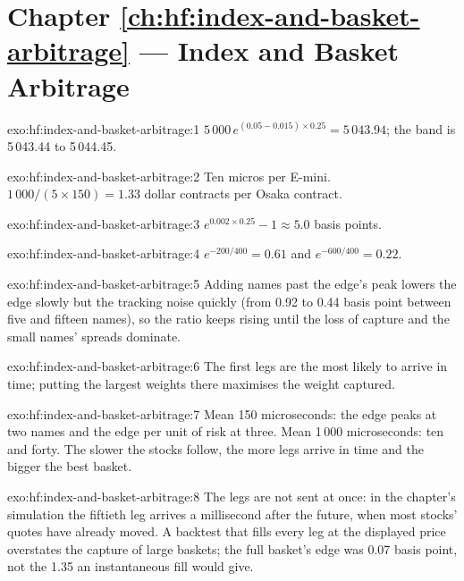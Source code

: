 \section*{Chapter \ref{ch:hf:index-and-basket-arbitrage} --- Index and Basket Arbitrage}

\begin{solution}{exo:hf:index-and-basket-arbitrage:1}
$5\,000\,e^{(0.05-0.015)\times0.25}=5\,043.94$; the band is 5\,043.44 to 5\,044.45.
\end{solution}

\begin{solution}{exo:hf:index-and-basket-arbitrage:2}
Ten micros per E-mini. $1\,000/(5\times150)=1.33$ dollar contracts per Osaka contract.
\end{solution}

\begin{solution}{exo:hf:index-and-basket-arbitrage:3}
$e^{0.002\times0.25}-1\approx5.0$ basis points.
\end{solution}

\begin{solution}{exo:hf:index-and-basket-arbitrage:4}
$e^{-200/400}=0.61$ and $e^{-600/400}=0.22$.
\end{solution}

\begin{solution}{exo:hf:index-and-basket-arbitrage:5}
Adding names past the edge's peak lowers the edge slowly but the tracking noise quickly (from 0.92 to 0.44 basis point between five and fifteen
names), so the ratio keeps rising until the loss of capture and the small names' spreads dominate.
\end{solution}

\begin{solution}{exo:hf:index-and-basket-arbitrage:6}
The first legs are the most likely to arrive in time; putting the largest weights there maximises the weight captured.
\end{solution}

\begin{solution}{exo:hf:index-and-basket-arbitrage:7}
Mean 150 microseconds: the edge peaks at two names and the edge per unit of risk at three. Mean 1\,000 microseconds: ten and forty. The slower the
stocks follow, the more legs arrive in time and the bigger the best basket.
\end{solution}

\begin{solution}{exo:hf:index-and-basket-arbitrage:8}
The legs are not sent at once: in the chapter's simulation the fiftieth leg arrives a millisecond after the future, when most stocks' quotes have
already moved. A backtest that fills every leg at the displayed price overstates the capture of large baskets; the full basket's edge was 0.07 basis
point, not the 1.35 an instantaneous fill would give.
\end{solution}

